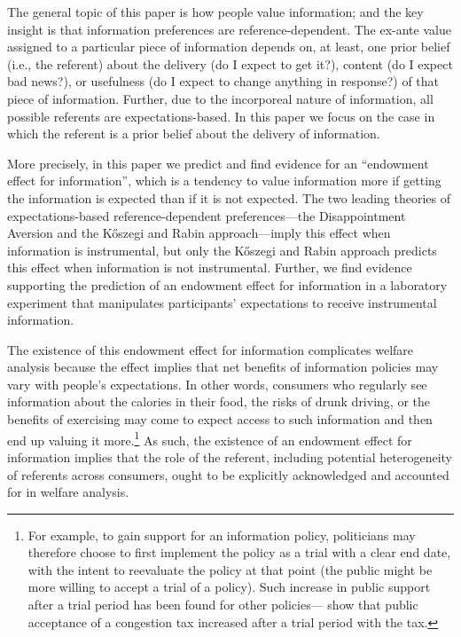 
The general topic of this paper is how people value information; and the key insight is that information preferences are reference-dependent. The ex-ante value assigned to a particular piece of information depends on, at least, one prior belief (i.e., the referent) about the delivery (do I expect to get it?), content (do I expect bad news?), or usefulness (do I expect to change anything in response?) of that piece of information. Further, due to the incorporeal nature of information, all possible referents are expectations-based. In this paper we focus on the case in which the referent is a prior belief about the delivery of information.

More precisely, in this paper we predict and find evidence for an \enquote{endowment effect for information}, which is a tendency to value information more if getting the information is expected than if it is not expected. The two leading theories of expectations-based reference-dependent preferences---the Disappointment Aversion and the Kőszegi and Rabin approach---imply this effect when information is instrumental, but only the Kőszegi and Rabin approach predicts this effect when information is not instrumental. Further, we find evidence supporting the prediction of an endowment effect for information in a laboratory experiment that manipulates participants’ expectations to receive instrumental information.


The existence of this endowment effect for information complicates welfare analysis because the effect implies that net benefits of information policies may vary with people’s expectations. In other words, consumers who regularly see information about the calories in their food, the risks of drunk driving, or the benefits of exercising may come to expect access to such information and then end up valuing it more.\footnote{For example, to gain support for an information policy, politicians may therefore choose to first implement the policy as a trial with a clear end date, with the intent to reevaluate the policy at that point (the public might be more willing to accept a trial of a policy). Such increase in public support after a trial period has been found for other policies---\citet{cherryImpactTrialRuns2014} show that public acceptance of a congestion tax increased after a trial period with the tax.} As such, the existence of an endowment effect for information implies that the role of the referent, including potential heterogeneity of referents across consumers, ought to be explicitly acknowledged and accounted for in welfare analysis.

